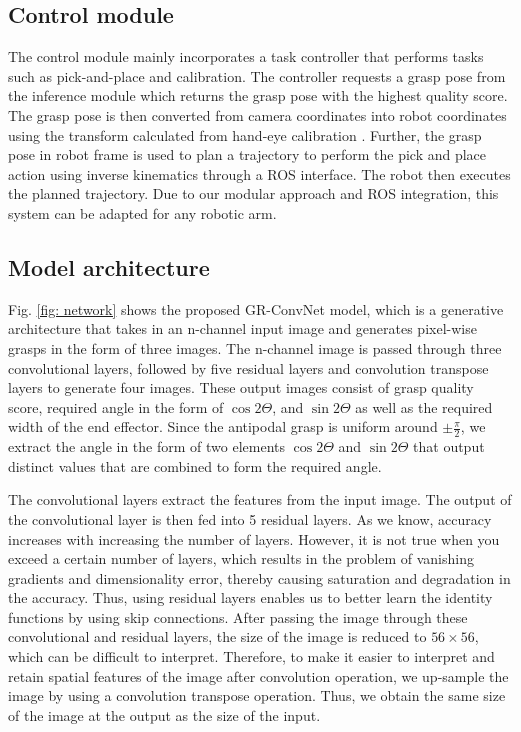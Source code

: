 \documentclass[letterpaper, 10pt, conference]{IEEEtran}
\begin{document}
\subsection{Control module}
The control module mainly incorporates a task controller that performs tasks such as pick-and-place and calibration. The controller requests a grasp pose from the inference module which returns the grasp pose with the highest quality score. The grasp pose is then converted from camera coordinates into robot coordinates using the transform calculated from hand-eye calibration \cite{strobl2006optimal}. Further, the grasp pose in robot frame is used to plan a trajectory to perform the pick and place action using inverse kinematics through a ROS interface. The robot then executes the planned trajectory. Due to our modular approach and ROS integration, this system can be adapted for any robotic arm.

\subsection{Model architecture}
Fig. \ref{fig: network} shows the proposed GR-ConvNet model, which is a generative architecture that takes in an n-channel input image and generates pixel-wise grasps in the form of three images. The n-channel image is passed through three convolutional layers, followed by five residual layers and convolution transpose layers to generate four images. These output images consist of grasp quality score, required angle in the form of $\cos{2\Theta}$, and $\sin{2\Theta}$ as well as the required width of the end effector. Since the antipodal grasp is uniform around $\pm \frac{\pi}{2}$, we extract the angle in the form of two elements $\cos{2\Theta}$ and $\sin{2\Theta}$ that output distinct values that are combined to form the required angle.

The convolutional layers extract the features from the input image. The output of the convolutional layer is then fed into 5 residual layers. As we know, accuracy increases with increasing the number of layers. However, it is not true when you exceed a certain number of layers, which results in the problem of vanishing gradients and dimensionality error, thereby causing saturation and degradation in the accuracy. Thus, using residual layers enables us to better learn the identity functions by using skip connections. After passing the image through these convolutional and residual layers, the size of the image is reduced to $56\times56$, which can be difficult to interpret. Therefore, to make it easier to interpret and retain spatial features of the image after convolution operation, we up-sample the image by using a convolution transpose operation. Thus, we obtain the same size of the image at the output as the size of the input. 
\end{document}

